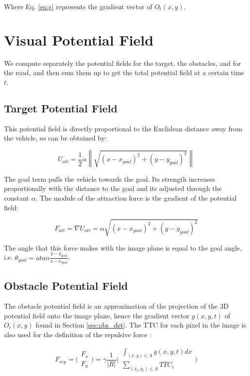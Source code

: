 \documentclass[letterpaper, 10 pt, conference]{ieeeconf}  %
\newcommand{\norm}[1]{\left\lVert#1\right\rVert}
\begin{document}
Where Eq. \eqref{eq:g} represents the gradient vector of $O_t(x,y)$.


    
\section{Visual Potential Field}

We compute separately the potential fields for the target, the obstacles, and for the road, and then sum them up to get the total potential field at a certain time $t$.

\subsection{Target Potential Field} \label{sec:tpf}

This potential field is directly proportional to the Euclidean distance away from the vehicle, so can be obtained by:

\begin{equation}
    U_{att}=\frac{1}{2}\alpha \norm{\sqrt{(x-x_{goal})^2+(y-y_{goal})^2}}
\end{equation}

The goal term pulls the vehicle towards the goal. Its strength increases proportionally with the distance to the goal and its adjusted through the constant $\alpha$. The module of the attraction force is the gradient of the potential field:

\begin{equation}
    F_{att}=\nabla U_{att}=\alpha\sqrt{(x-x_{goal})^2+(y-y_{goal})^2}
\end{equation}

The angle that this force makes with the image plane is equal to the goal angle, i.e. $\theta_{goal}=atan \frac{y-y_{goal}}{x-x_{goal}}$. 

\subsection{Obstacle Potential Field} \label{sec:opf}

The obstacle potential field is an approximation of the projection of the 3D potential field onto the image plane, hence the gradient vector $g(x,y,t)$ of $O_t(x,y)$ found in Section \ref{sec:obs_det}. The TTC for each pixel in the image is also used for the definition of the repulsive force \cite{ohnishi2008visual,miao2017optical}:

\begin{equation}
    F_{rep} = \bigg( \begin{matrix} F_x\\ F_y \end{matrix} \bigg) = \gamma \frac{1}{|R|} \Bigg( \begin{matrix} \int_{(x,y)\in A}g(x,y,t)dx \\ \sum_{(x_i,y_i) \in A} TTC_i \end{matrix} \Bigg)
\end{equation}
\end{document}
